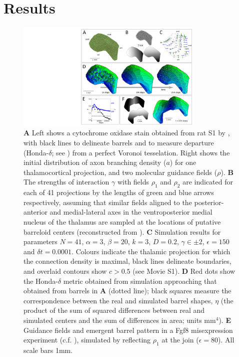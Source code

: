 \documentclass[9pt,twocolumn,twoside,lineno]{pnas-new}
\begin{document}
\section*{Results}

\begin{figure}
\begin{center}
\includegraphics[width=0.8\textwidth]{./MainFig.png}
\end{center}
\caption{\textbf{A} Left shows a cytochrome oxidase stain obtained from rat S1 by \cite{zheng_signal_2001}, with black lines to delineate barrels and to measure departure (Honda-$\delta$; see \cite{senft_mouse_1991}) from a perfect Voronoi tesselation. Right shows the initial distribution of axon branching density ($a$) for one thalamocortical projection, and two molecular guidance fields ($\rho$). \textbf{B} The strengths of interaction $\gamma$ with fields $\rho_1$ and $\rho_2$ are indicated for each of 41 projections by the lengths of green and blue arrows respectively, assuming that similar fields aligned to the posterior-anterior and medial-lateral axes in the ventroposterior medial nucleus of the thalamus are sampled at the locations of putative barreloid centers (reconstructed from \cite{haidarliu_size_2001}). \textbf{C} Simulation results for parameters $N=41$, $\alpha=3$, $\beta=20$, $k=3$, $D=0.2$, $\gamma\in\pm 2$, $\epsilon=150$ and $\delta{t}=0.0001$. Colours indicate the thalamic projection for which the connection density is maximal, black lines delineate boundaries, and overlaid contours show $c>0.5$ (see Movie S1). \textbf{D} Red dots show the Honda-$\delta$ metric obtained from simulation approaching that obtained from barrels in \textbf{A} (dotted line);  black squares measure the correspondence between the real and simulated barrel shapes, $\eta$ (the product of the sum of squared differences between real and simulated centers and the sum of differences in area; units mm$^4$). \textbf{E} Guidance fields and emergent barrel pattern in a Fgf8 misexpression experiment (c.f. \cite{assimacopoulos_fibroblast_2012}), simulated by reflecting $\rho_1$ at the join ($\epsilon=80$). All scale bars 1mm.}
\label{fig:main}
\end{figure}
\end{document}
